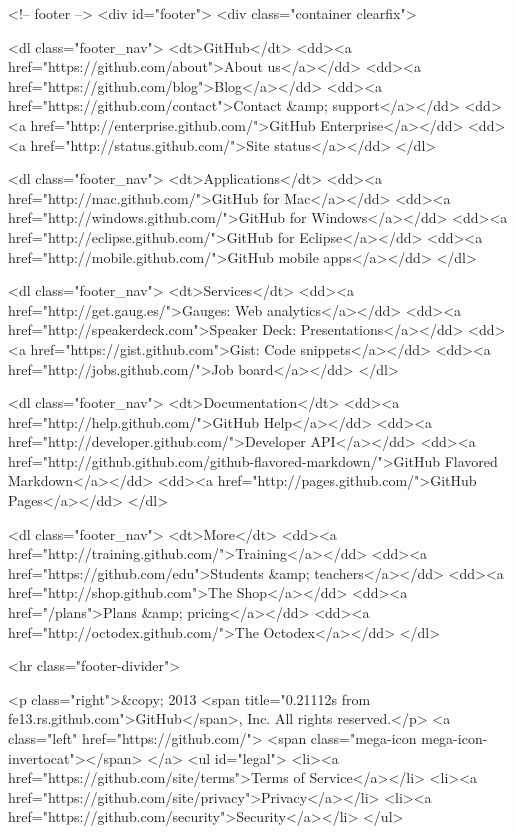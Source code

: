       <!-- footer -->
      <div id="footer">
  <div class="container clearfix">

      <dl class="footer_nav">
        <dt>GitHub</dt>
        <dd><a href="https://github.com/about">About us</a></dd>
        <dd><a href="https://github.com/blog">Blog</a></dd>
        <dd><a href="https://github.com/contact">Contact &amp; support</a></dd>
        <dd><a href="http://enterprise.github.com/">GitHub Enterprise</a></dd>
        <dd><a href="http://status.github.com/">Site status</a></dd>
      </dl>

      <dl class="footer_nav">
        <dt>Applications</dt>
        <dd><a href="http://mac.github.com/">GitHub for Mac</a></dd>
        <dd><a href="http://windows.github.com/">GitHub for Windows</a></dd>
        <dd><a href="http://eclipse.github.com/">GitHub for Eclipse</a></dd>
        <dd><a href="http://mobile.github.com/">GitHub mobile apps</a></dd>
      </dl>

      <dl class="footer_nav">
        <dt>Services</dt>
        <dd><a href="http://get.gaug.es/">Gauges: Web analytics</a></dd>
        <dd><a href="http://speakerdeck.com">Speaker Deck: Presentations</a></dd>
        <dd><a href="https://gist.github.com">Gist: Code snippets</a></dd>
        <dd><a href="http://jobs.github.com/">Job board</a></dd>
      </dl>

      <dl class="footer_nav">
        <dt>Documentation</dt>
        <dd><a href="http://help.github.com/">GitHub Help</a></dd>
        <dd><a href="http://developer.github.com/">Developer API</a></dd>
        <dd><a href="http://github.github.com/github-flavored-markdown/">GitHub Flavored Markdown</a></dd>
        <dd><a href="http://pages.github.com/">GitHub Pages</a></dd>
      </dl>

      <dl class="footer_nav">
        <dt>More</dt>
        <dd><a href="http://training.github.com/">Training</a></dd>
        <dd><a href="https://github.com/edu">Students &amp; teachers</a></dd>
        <dd><a href="http://shop.github.com">The Shop</a></dd>
        <dd><a href="/plans">Plans &amp; pricing</a></dd>
        <dd><a href="http://octodex.github.com/">The Octodex</a></dd>
      </dl>

      <hr class="footer-divider">


    <p class="right">&copy; 2013 <span title="0.21112s from fe13.rs.github.com">GitHub</span>, Inc. All rights reserved.</p>
    <a class="left" href="https://github.com/">
      <span class="mega-icon mega-icon-invertocat"></span>
    </a>
    <ul id="legal">
        <li><a href="https://github.com/site/terms">Terms of Service</a></li>
        <li><a href="https://github.com/site/privacy">Privacy</a></li>
        <li><a href="https://github.com/security">Security</a></li>
    </ul>

